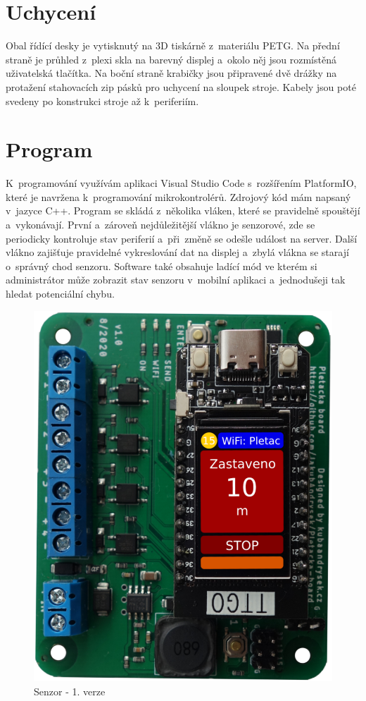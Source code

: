 \section{Uchycení}
Obal řídící desky je vytisknutý na 3D tiskárně z~materiálu PETG.
Na přední straně je průhled z~plexi skla na barevný displej a~okolo něj jsou rozmístěná uživatelská tlačítka.
Na boční straně krabičky jsou připravené dvě drážky na protažení stahovacích zip pásků pro uchycení na sloupek stroje.
Kabely jsou poté svedeny po konstrukci stroje až k~periferiím.


\section{Program}
K~programování využívám aplikaci Visual Studio Code s~rozšířením PlatformIO, které je navržena k~programování mikrokontrolérů. 
Zdrojový kód mám napsaný v~jazyce C++.
Program se skládá z~několika vláken, které se pravidelně spouštějí a~vykonávají.
První a~zároveň nejdůležitější vlákno je senzorové, zde se periodicky kontroluje stav periferií a~při~změně se odešle událost na server.
Další vlákno zajišťuje pravidelné vykreslování dat na displej a~zbylá vlákna se starají o~správný chod senzoru.
Software také obsahuje ladící mód ve kterém si administrátor může zobrazit stav senzoru v~mobilní aplikaci a~jednodušeji tak hledat potenciální chybu. 


\begin{figure}[htbp]
    \centering
    \includegraphics[width=\textwidth/2]{img/V1-deska-esp-screen.png}
    \caption{Senzor - 1. verze}
    \label{fig:SenzorV1}
\end{figure}


